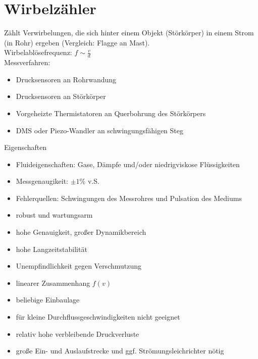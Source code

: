 \section{Wirbelzähler}
Zählt Verwirbelungen, die sich hinter einem Objekt (Störkörper) in einem Strom (in Rohr) ergeben (Vergleich: Flagge an Mast).\\
Wirbelablösefrequenz: $f \sim \frac{v}{d}$\\
Messverfahren:
\begin{itemize}
\item Drucksensoren an Rohrwandung
\item Drucksensoren an Störkörper
\item Vorgeheizte Thermistatoren an Querbohrung des Störkörpers
\item DMS oder Piezo-Wandler an schwingungsfähigen Steg
\end{itemize}
Eigenschaften
\begin{itemize}
\item Fluideigenschaften: Gase, Dämpfe und/oder niedrigviskose Flüssigkeiten
\item Messgenaugikeit: $\pm 1 \%$ v.S.
\item Fehlerquellen: Schwingungen des Messrohres und Pulsation des Mediums
\end{itemize}
\begin{itemize}[label=$+$]
\item robust und wartungsarm
\item hohe Genauigkeit, großer Dynamikbereich
\item hohe Langzeitstabilität
\item Unempfindlichkeit gegen Verschmutzung
\item linearer Zusammenhang $f(v)$
\item beliebige Einbaulage
\end{itemize}
\begin{itemize}[label=$-$]
\item für kleine Durchflussgeschwindigkeiten nicht geeignet
\item relativ hohe verbleibende Druckverluste
\item große Ein- und Auslaufstrecke und ggf. Strömungsleichrichter nötig
\end{itemize}

